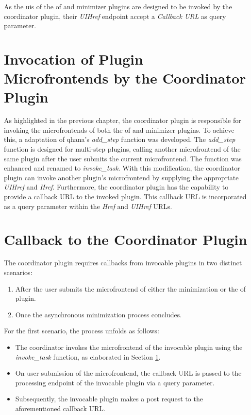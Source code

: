 \documentclass[
  a4paper,  %
  twoside,  %
  bibliography=totoc,
  headsepline,
  cleardoublepage=empty,
  parskip=half,
  draft=false
]{scrbook}
\begin{document}
As the \glspl{ui} of the \gls{of} and minimizer plugins are designed to be invoked by the coordinator plugin, their \emph{UIHref} endpoint accept a \emph{Callback URL} as query parameter.





\section{Invocation of Plugin Microfrontends by the Coordinator Plugin}
\label{sec:invocationOfPluginMicrofrontendsByTheCoordinatorPlugin}

As highlighted in the previous chapter, the coordinator plugin is responsible for invoking the microfrontends of both the \gls{of} and minimizer plugins.
To achieve this, a adaptation of \gls{qhana}'s \emph{add\_step} function was developed.
The \emph{add\_step} function is designed for multi-step plugins, calling another microfrontend of the same plugin after the user submits the current microfrontend.
The function was enhanced and renamed to \emph{invoke\_task}.
With this modification, the coordinator plugin can invoke another plugin's microfrontend by supplying the appropriate \emph{UIHref} and \emph{Href}.
Furthermore, the coordinator plugin has the capability to provide a callback URL to the invoked plugin.
This callback URL is incorporated as a query parameter within the \emph{Href} and \emph{UIHref} URLs.

\section{Callback to the Coordinator Plugin}
\label{sec:implementationOfCallbacksToTheCoordinatorPlugin}

The coordinator plugin requires callbacks from invocable plugins in two distinct scenarios:
\begin{enumerate}
    \item After the user submits the microfrontend of either the minimization or the \gls{of} plugin.
    \item Once the asynchronous minimization process concludes.
\end{enumerate}

For the first scenario, the process unfolds as follows:
\begin{itemize}
    \item The coordinator invokes the microfrontend of the invocable plugin using the \emph{invoke\_task} function, as elaborated in Section \ref{sec:invocationOfPluginMicrofrontendsByTheCoordinatorPlugin}.
    \item On user submission of the microfrontend, the callback URL is passed to the processing endpoint of the invocable plugin via a query parameter.
    \item Subsequently, the invocable plugin makes a post request to the aforementioned callback URL.
\end{itemize}
\end{document}
